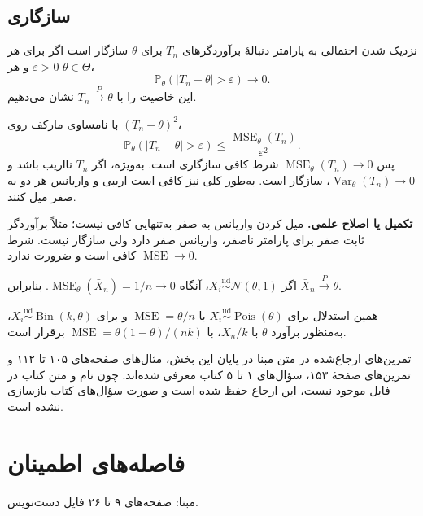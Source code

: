 \documentclass[12pt,a4paper,oneside]{report}
\newcounter{ex}[chapter]
\newenvironment{example}[1]{\refstepcounter{ex}\begin{tcolorbox}[breakable=false,title={مثال \thechapter.\arabic{ex} | #1},colframe=muted,colback=white]}{\end{tcolorbox}}
\newcommand{\edit}[1]{\par\begingroup\small\color{alert}\textbf{تکمیل یا اصلاح علمی.} #1\par\endgroup}
\newcommand{\source}[1]{\par{\small\color{muted} مبنا: صفحه‌های #1 فایل دست‌نویس.}\par}
\newcommand{\Var}{\operatorname{Var}}
\newcommand{\MSE}{\operatorname{MSE}}
\newcommand{\iid}{\overset{\mathrm{iid}}{\sim}}
\newcommand{\N}{\mathcal N}
\newcommand{\Prob}{\mathbb P}
\begin{document}
\section{سازگاری}
\begin{definition}{نزدیک شدن احتمالی به پارامتر}
دنبالهٔ برآوردگرهای $T_n$ برای $\theta$ سازگار است اگر برای هر $\varepsilon>0$ و هر $\theta\in\Theta$،
\[
\Prob_\theta(|T_n-\theta|>\varepsilon)\longrightarrow0.
\]
این خاصیت را با $T_n\xrightarrow{P}\theta$ نشان می‌دهیم.
\end{definition}
با نامساوی مارکف روی $(T_n-\theta)^2$،
\[
\Prob_\theta(|T_n-\theta|>\varepsilon)
\le\frac{\MSE_\theta(T_n)}{\varepsilon^2}.
\]
پس $\MSE_\theta(T_n)\to0$ شرط کافی سازگاری است. به‌ویژه، اگر $T_n$ نااریب باشد و $\Var_\theta(T_n)\to0$، سازگار است. به‌طور کلی نیز کافی است اریبی و واریانس هر دو به صفر میل کنند.
\edit{میل کردن واریانس به صفر به‌تنهایی کافی نیست؛ مثلاً برآوردگر ثابت صفر برای پارامتر ناصفر، واریانس صفر دارد ولی سازگار نیست. شرط $\MSE\to0$ کافی است و ضرورت ندارد.}
\begin{example}{سازگاری میانگین}
اگر $X_i\iid\N(\theta,1)$، آنگاه $\MSE_\theta(\bar X_n)=1/n\to0$. بنابراین $\bar X_n\xrightarrow{P}\theta$.

همین استدلال برای $X_i\iid\operatorname{Pois}(\theta)$ با $\MSE=\theta/n$ و برای $X_i\iid\operatorname{Bin}(k,\theta)$، به‌منظور برآورد $\theta$ با $\bar X_n/k$، با $\MSE=\theta(1-\theta)/(nk)$ برقرار است.
\end{example}
\begin{important}{تمرین‌های ارجاع‌شده در متن مبنا}
در پایان این بخش، مثال‌های صفحه‌های ۱۰۵ تا ۱۱۲ و تمرین‌های صفحهٔ ۱۵۳، سؤال‌های ۱ تا ۵ کتاب معرفی شده‌اند. چون نام و متن کتاب در فایل موجود نیست، این ارجاع حفظ شده است و صورت سؤال‌های کتاب بازسازی نشده است.
\end{important}

\chapter{فاصله‌های اطمینان}
\source{۹ تا ۲۶}
\end{document}
